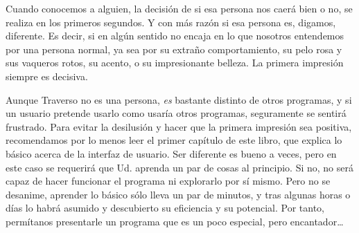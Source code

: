 Cuando conocemos a alguien, la decisión de si esa persona nos caerá bien o no, se realiza en los primeros segundos. Y con más razón si esa persona es, digamos, diferente. Es decir, si en algún sentido no encaja en lo que nosotros entendemos por una persona normal, ya sea por su extraño comportamiento, su pelo rosa y sus vaqueros rotos, su acento, o su impresionante belleza. La primera impresión siempre es decisiva.

Aunque Traverso no es una persona, \emph{es} bastante distinto de otros programas, y si un usuario pretende usarlo como usaría otros programas, seguramente se sentirá frustrado. Para evitar la desilusión y hacer que la primera impresión sea positiva, recomendamos por lo menos leer el primer capítulo de este libro, que explica lo básico acerca de la interfaz de usuario. Ser diferente es bueno a veces, pero en este caso se requerirá que Ud. aprenda un par de cosas al principio. Si no, no será capaz de hacer funcionar el programa ni explorarlo por sí mismo. Pero no se desanime, aprender lo básico sólo lleva un par de minutos, y tras algunas horas o días lo habrá asumido y descubierto su eficiencia y su potencial. Por tanto, permítanos presentarle un programa que es un poco especial, pero encantador\dots
